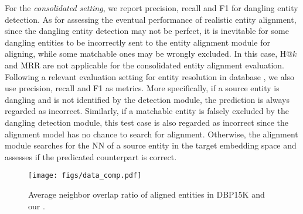 For the \emph{consolidated setting},
we report precision, recall and F1 for dangling entity detection.
As for assessing the eventual performance of realistic entity alignment, since the dangling entity detection may not be perfect,
it is inevitable for some dangling entities to be incorrectly sent to the entity alignment module for aligning, while some matchable ones may be wrongly excluded.
In this case, H@$k$ and MRR are not applicable for the consolidated entity alignment evaluation. 
Following a relevant evaluation setting for entity resolution in database \cite{DL4ER,EmbedER}, we also use precision, recall and F1 as metrics.
More specifically, if a source entity is dangling and is not identified by the detection module, the prediction is always regarded as incorrect. 
Similarly, if a matchable entity is falsely excluded by the dangling detection module, this test case is also regarded as incorrect since the alignment model has no chance to search for alignment. 
Otherwise, the alignment module searches for the NN of a source entity in the target embedding space and assesses if the predicated counterpart is correct. 

\begin{figure}[t]
	\centering
	\texttt{[image: figs/data\_comp.pdf]}
	\caption{Average neighbor overlap ratio of aligned entities in DBP15K and our \dataset.}
	\label{fig:data_comp}
\end{figure}

